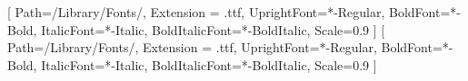 \makeatletter
\renewcommand{\maketitle}{\bgroup\setlength{\parindent}{0pt}
\begin{flushleft}
  {\sffamily\huge\textbf{\MakeUppercase{\@title}}} \vspace{0.3cm} \newline
  {\Large {\@subtitle}} \newline
  \@author
\end{flushleft}\egroup
}
\makeatother

\setsansfont{Ubuntu}[
    Path={/Library/Fonts/},
    Extension = .ttf,
    UprightFont=*-Regular,
    BoldFont=*-Bold,
    ItalicFont=*-Italic,
    BoldItalicFont=*-BoldItalic,
    Scale=0.9
    ]
%
\setmainfont{Ubuntu}[
    Path={/Library/Fonts/},
    Extension = .ttf,
    UprightFont=*-Regular,
    BoldFont=*-Bold,
    ItalicFont=*-Italic,
    BoldItalicFont=*-BoldItalic,
    Scale=0.9
    ]
%

\usepackage[skins, breakable]{tcolorbox}
\newenvironment{speakernotes}{%
  \begin{tcolorbox}[colback=gray!10, colframe=gray!50, title=Speaker Notes, fonttitle=\bfseries\small, fontupper=\small]
}{%
  \end{tcolorbox}
}


